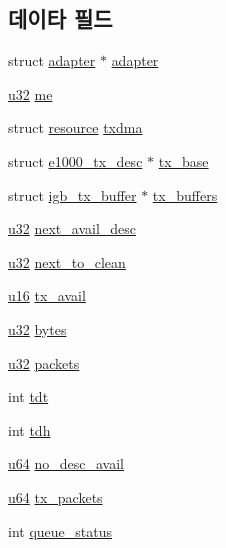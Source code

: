 \subsection*{데이타 필드}
\begin{DoxyCompactItemize}
\item 
struct \hyperlink{structadapter}{adapter} $\ast$ \hyperlink{structtx__ring_a807e6014970a3d469e197cd9ec25229c}{adapter}
\item 
\hyperlink{lib_2igb_2e1000__osdep_8h_a64e91c10a0d8fb627e92932050284264}{u32} \hyperlink{structtx__ring_af754e6af13b532f2bebcaa3828ea795c}{me}
\item 
struct \hyperlink{structresource}{resource} \hyperlink{structtx__ring_aefdccf596fff8b81ada9dd89b75697a8}{txdma}
\item 
struct \hyperlink{structe1000__tx__desc}{e1000\+\_\+tx\+\_\+desc} $\ast$ \hyperlink{structtx__ring_afcf2ae577a4363723c3403d160dd4d01}{tx\+\_\+base}
\item 
struct \hyperlink{structigb__tx__buffer}{igb\+\_\+tx\+\_\+buffer} $\ast$ \hyperlink{structtx__ring_a9b0485752fc6d8befa2f35ebd45710db}{tx\+\_\+buffers}
\item 
\hyperlink{lib_2igb_2e1000__osdep_8h_a64e91c10a0d8fb627e92932050284264}{u32} \hyperlink{structtx__ring_a11612fa87762d1d1e6a7eccfb865b805}{next\+\_\+avail\+\_\+desc}
\item 
\hyperlink{lib_2igb_2e1000__osdep_8h_a64e91c10a0d8fb627e92932050284264}{u32} \hyperlink{structtx__ring_a6b93808fe90341d9209770bf06dcdc6c}{next\+\_\+to\+\_\+clean}
\item 
\hyperlink{lib_2igb_2e1000__osdep_8h_acdc9cf0314be0ae5a01d6d4379a95edd}{u16} \hyperlink{structtx__ring_a3f8acb3cacc1230f5a5b78b1b6cf7c2a}{tx\+\_\+avail}
\item 
\hyperlink{lib_2igb_2e1000__osdep_8h_a64e91c10a0d8fb627e92932050284264}{u32} \hyperlink{structtx__ring_a7056b21e5e7773c9205b38f00a3a75c2}{bytes}
\item 
\hyperlink{lib_2igb_2e1000__osdep_8h_a64e91c10a0d8fb627e92932050284264}{u32} \hyperlink{structtx__ring_a5ff69346aaa72fb9bf0c095156ddccbb}{packets}
\item 
int \hyperlink{structtx__ring_a243ec776558d79c629a52f9a838ad88f}{tdt}
\item 
int \hyperlink{structtx__ring_a9bbc2a335ca600a3193455be30b6b03b}{tdh}
\item 
\hyperlink{lib_2igb_2e1000__osdep_8h_a1d8f78f95a414480659f3182e6067b80}{u64} \hyperlink{structtx__ring_a145e411f042377d5944c920fc219fbe7}{no\+\_\+desc\+\_\+avail}
\item 
\hyperlink{lib_2igb_2e1000__osdep_8h_a1d8f78f95a414480659f3182e6067b80}{u64} \hyperlink{structtx__ring_aecff768191caa8237ae27ddfac500aaa}{tx\+\_\+packets}
\item 
int \hyperlink{structtx__ring_ac2917164cdb60559cb6fb4367f48ca24}{queue\+\_\+status}
\end{DoxyCompactItemize}


